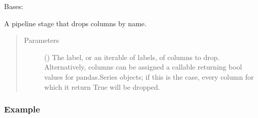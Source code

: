 \documentclass[letterpaper,10pt,english]{sphinxmanual}
\begin{document}
\begin{fulllineitems}
\label{\detokenize{dalio.pipe:dalio.pipe.ColDrop}}
Bases: 

A pipeline stage that drops columns by name.
\begin{quote}\begin{description}
\item[{Parameters}] \leavevmode
{} (\sphinxstyleliteralemphasis{\sphinxupquote{, }}) \textendash{} The label, or an iterable of labels, of columns to drop. Alternatively,
columns can be assigned a callable returning bool values for
pandas.Series objects; if this is the case, every column for which it
return True will be dropped.

\end{description}\end{quote}
\subsubsection*{Example}

\begin{sphinxVerbatim}[commandchars=\\\{\}]
       
  \PYG{p}{[}\PYG{p}{[}\PYG{p}{]}\PYG{p}{[}\PYG{p}{]}\PYG{p}{]} \PYG{p}{[}\PYG{p}{]} \PYG{p}{[} \PYG{p}{]}
\end{sphinxVerbatim}


\end{fulllineitems}
\end{document}

